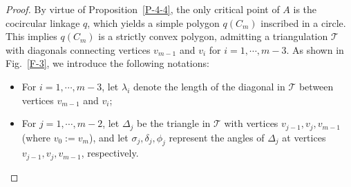 \documentclass[11pt,letterpaper]{amsart}
\theoremstyle{plain}
\theoremstyle{definition}
\theoremstyle{remark}
\numberwithin{equation}{section}
\begin{document}
\begin{proof}
By virtue of Proposition~\ref{P-4-4}, the only critical point of $A$ is the cocircular  linkage $q$, which yields a simple polygon $q(C_m)$ inscribed in a circle. This implies $q(C_m)$ is a strictly convex polygon, admitting a triangulation $\mathcal T$ with diagonals connecting vertices $v_{m-1}$ and $v_i$ for $i=1,\cdots,m-3$. As shown in Fig.~\ref{F-3}, we introduce the following notations:
\begin{itemize}
\item{} For $i=1,\cdots,m-3$, let $\lambda_i$ denote the length of the diagonal in $\mathcal T$ between vertices $v_{m-1}$ and $v_i$;
\item{} For $j=1,\cdots,m-2$, let $\Delta_j$ be the triangle in $\mathcal T$ with vertices $v_{j-1},v_{j},v_{m-1}$ (where $v_0:=v_m$), and let $\sigma_j,\delta_j,\phi_j$ represent the angles of  $\Delta_j$ at vertices $v_{j-1},v_j,v_{m-1}$, respectively.
\end{itemize}

\begin{figure}[htbp]
     \centering
{}
\end{figure}
\end{proof}
\end{document}
